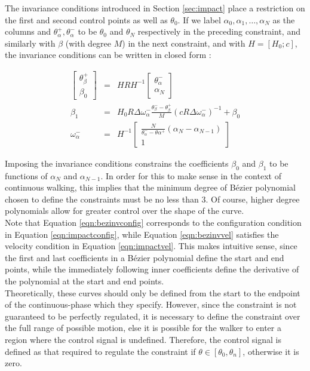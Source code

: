 The invariance conditions introduced in Section \ref{sec:impact} place a restriction on the first and second control points as well as $\theta_0$. If we label $\alpha_0, \alpha_1, \ldots, \alpha_N$ as the columns and $\theta_\alpha^+, \theta_\alpha^-$ to be $\theta_0$ and $\theta_N$ respectively in the preceding constraint, and similarly with $\beta$ (with degree $M$) in the next constraint, and with $H = [H_0; c]$, the invariance conditions can be written in closed form \cite{westervelt2007feedback}:

\begin{eqnarray}
	\begin{bmatrix}
	\theta_\beta^+ \\ \beta_0
	\end{bmatrix}
	&=& HRH^{-1} \begin{bmatrix}
		\theta_\alpha^- \\ \alpha_N
	\end{bmatrix} \label{eqn:bezinvconfig} \\
	\beta_1 &=& H_0R\Delta\omega_\alpha^-\frac{\theta_\beta^- - \theta_\beta^+}{M}(cR\Delta\omega_\alpha^-)^{-1} + \beta_0 \label{eqn:bezinvvel} \\
	\omega_\alpha^- &=& H^{-1}\begin{bmatrix}
		\frac{N}{\theta_\alpha^- - \theta\alpha^+}(\alpha_N - \alpha_{N-1}) \\ 1
	\end{bmatrix}
\end{eqnarray}

Imposing the invariance conditions constrains the coefficients $\beta_0$ and $\beta_1$ to be functions of $\alpha_N$ and $\alpha_{N-1}$. In order for this to make sense in the context of continuous walking, this implies that the minimum degree of Bézier polynomial chosen to define the constraints must be no less than 3. Of course, higher degree polynomials allow for greater control over the shape of the curve. \\

Note that Equation \ref{eqn:bezinvconfig} corresponds to the configuration condition in Equation \ref{eqn:impactconfig}, while Equation \ref{eqn:bezinvvel} satisfies the velocity condition in Equation \ref{eqn:impactvel}. This makes intuitive sense, since the first and last coefficients in a Bézier polynomial define the start and end points, while the immediately following inner coefficients define the derivative of the polynomial at the start and end points. \\

Theoretically, these curves should only be defined from the start to the endpoint of the continuous-phase which they specify. However, since the constraint is not guaranteed to be perfectly regulated, it is necessary to define the constraint over the full range of possible motion, else it is possible for the walker to enter a region where the control signal is undefined. Therefore, the control signal is defined as that required to regulate the constraint if $\theta \in [\theta_0, \theta_n]$, otherwise it is zero.\\